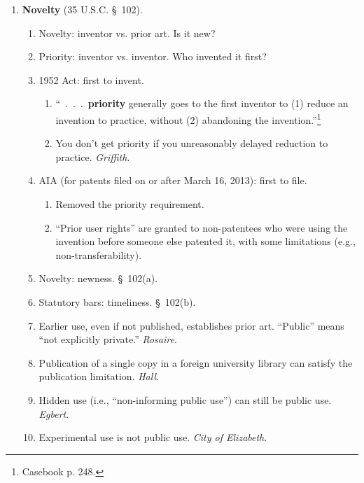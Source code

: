\begin{enumerate}
\begin{enumerate}
\begin{enumerate}
        \end{enumerate}
        \item \textbf{Novelty} (35 U.S.C. \S\ 102).
        \begin{enumerate}
            \item Novelty: inventor vs. prior art. Is it new?
            \item Priority: inventor vs. inventor. Who invented it first?
            \item 1952 Act: first to invent.
            \begin{enumerate}
                \item ``~.~.~.~\textbf{priority} generally goes to the first 
                inventor to (1) reduce an invention to practice, without (2) 
                abandoning the invention.''\footnote{Casebook p. 248.}
                \item You don't get priority if you unreasonably delayed 
                reduction to practice. \emph{Griffith}.
            \end{enumerate}
            \item AIA (for patents filed on or after March 16, 2013): first to 
            file. 
            \begin{enumerate}
                \item Removed the priority requirement.
                \item ``Prior user rights'' are granted to non-patentees who 
                were using the invention before someone else patented it, with 
                some limitations (e.g., non-transferability).
            \end{enumerate}
            \item Novelty: newness. \S\ 102(a).
            \item Statutory bars: timeliness. \S\ 102(b).
            \item Earlier use, even if not published, establishes prior art. 
            ``Public'' means ``not explicitly private.'' \emph{Rosaire}.
            \item Publication of a single copy in a foreign university library 
            can satisfy the publication limitation. \emph{Hall}.
            \item Hidden use (i.e., ``non-informing public use'') can still be 
            public use. \emph{Egbert}.
            \item Experimental use is not public use. \emph{City of 
            Elizabeth}.
        \end{enumerate}

\end{enumerate}
\end{enumerate}
